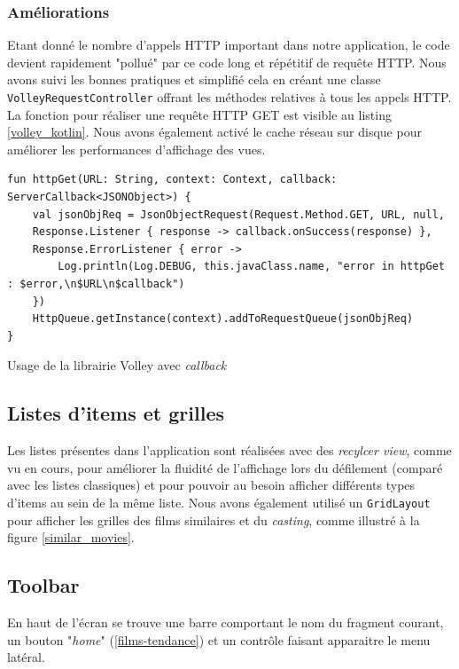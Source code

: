 \subsubsection{Améliorations}
Etant donné le nombre d'appels HTTP important dans notre application, le code devient rapidement "pollué" par ce code long et répétitif de requête HTTP. Nous avons suivi les bonnes pratiques et simplifié cela en créant une classe \texttt{VolleyRequestController} offrant les méthodes relatives à tous les appels HTTP. La fonction pour réaliser une requête HTTP GET est visible au listing \ref{volley_kotlin}. Nous avons également activé le cache réseau sur disque pour améliorer les performances d'affichage des vues.
\bigbreak
\begin{code}
    \begin{verbatim}
fun httpGet(URL: String, context: Context, callback: ServerCallback<JSONObject>) {
    val jsonObjReq = JsonObjectRequest(Request.Method.GET, URL, null,
    Response.Listener { response -> callback.onSuccess(response) },
    Response.ErrorListener { error ->
        Log.println(Log.DEBUG, this.javaClass.name, "error in httpGet : $error,\n$URL\n$callback")
    })
    HttpQueue.getInstance(context).addToRequestQueue(jsonObjReq)
}
    \end{verbatim}
    \caption{Usage de la librairie Volley avec \textit{callback}}
    \label{volley_kotlin}
\end{code}
\bigbreak

\subsection{Listes d'items et grilles}
Les listes présentes dans l'application sont réalisées avec des \textit{recylcer view}, comme vu en cours, pour améliorer la fluidité de l'affichage lors du défilement (comparé avec les listes classiques) et pour pouvoir au besoin afficher différents types d'items au sein de la même liste. Nous avons également utilisé un \texttt{GridLayout} pour afficher les grilles des films similaires et du \textit{casting}, comme illustré à la figure \ref{similar_movies}.

\subsection{Toolbar}
En haut de l'écran se trouve une barre comportant le nom du fragment courant, un bouton "\textit{home}" (\ref{films-tendance}) et un contrôle faisant apparaitre le menu latéral.

